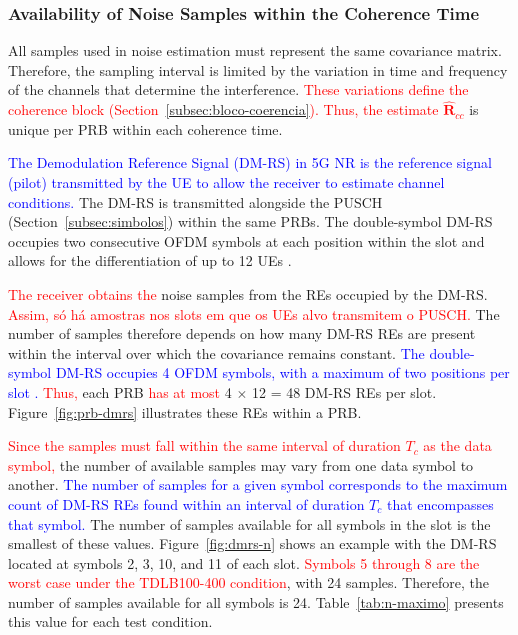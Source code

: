 \subsubsection{Availability of Noise Samples within the Coherence Time}\label{subsubsec:disponibilidade-amostras}
All samples used in noise estimation must represent the same covariance matrix. Therefore, the sampling interval is limited by the variation in time and frequency of the channels that determine the interference. \textcolor{red}{These variations define the coherence block (Section~\ref{subsec:bloco-coerencia}). Thus, the estimate $\hat{\mathbf R}_{cc}$} is unique per PRB within each coherence time.


\textcolor{blue}{The Demodulation Reference Signal (DM-RS) in 5G NR is the reference signal (pilot) transmitted by the UE to allow the receiver to estimate channel conditions.} The DM-RS is transmitted alongside the PUSCH (Section~\ref{subsec:simbolos}) within the same PRBs. The double-symbol DM-RS occupies two consecutive OFDM symbols at each position within the slot and allows for the differentiation of up to 12 UEs \cite{3gpp-ts38211}.

\textcolor{red}{The receiver obtains the} noise samples from the REs occupied by the DM-RS. \textcolor{red}{Assim, só há amostras nos slots em que os UEs alvo transmitem o PUSCH.} The number of samples therefore depends on how many DM-RS REs are present within the interval over which the covariance remains constant. \textcolor{blue}{The double-symbol DM-RS occupies 4 OFDM symbols, with a maximum of two positions per slot \cite{3gpp-ts38211}.} \textcolor{red}{Thus,} each PRB \textcolor{red}{has at most} 4 $\times$ 12 = 48 DM-RS REs per slot. Figure~\ref{fig:prb-dmrs} illustrates these REs within a PRB.



\textcolor{red}{Since the samples must fall within the same interval of duration $T_c$ as the data symbol,} the number of available samples may vary from one data symbol to another. \textcolor{blue}{The number of samples for a given symbol corresponds to the maximum count of DM-RS REs found within an interval of duration $T_c$ that encompasses that symbol.} The number of samples available for all symbols in the slot is the smallest of these values. Figure~\ref{fig:dmrs-n} shows an example with the DM-RS located at symbols 2, 3, 10, and 11 of each slot. \textcolor{red}{Symbols 5 through 8 are the worst case under the TDLB100-400 condition}, with 24 samples. Therefore, the number of samples available for all symbols is 24. Table~\ref{tab:n-maximo} presents this value for each test condition.

